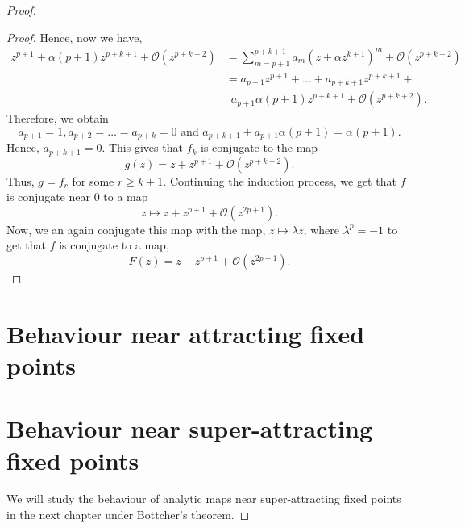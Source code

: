 \begin{proof}
\begin{proof}
	Hence, now we have,
	\begin{align*}
		z^{p+1}+\alpha(p+1)z^{p+k+1}+\mathcal{O}(z^{p+k+2})&=\sum_{m=p+1}^{p+k+1} a_m(z+\alpha z^{k+1})^m+\mathcal{O}(z^{p+k+2})\\
														   &=a_{p+1}z^{p+1}+\ldots +a_{p+k+1}z^{p+k+1}+\\&\,\,\,a_{p+1}\alpha(p+1)z^{p+k+1}+\mathcal{O}(z^{p+k+2})
	.\end{align*}
	Therefore, we obtain \[
		a_{p+1}=1,a_{p+2}=\ldots =a_{p+k}=0\text{ and }a_{p+k+1}+a_{p+1}\alpha(p+1)=\alpha(p+1)
	.\] 
	Hence, \( a_{p+k+1}=0 \). This gives that \( f_k \) is conjugate to the map \[
		g(z)=z+z^{p+1}+\mathcal{O}(z^{p+k+2})
	.\] 
	Thus, \( g=f_r \) for some \( r\ge k+1 \). Continuing the induction process, we get that \( f \)
	is conjugate near \( 0 \) to a map \[
		z\mapsto z+z^{p+1}+\mathcal{O}(z^{2p+1})
	.\] 
	Now, we an again conjugate this map with the map, \( z\mapsto \lambda z \), where \( \lambda^p=-1 \) to get that \( f \) is conjugate to a map, \[
		F(z)=z-z^{p+1}+\mathcal{O}(z^{2p+1})
	.\] 
\end{proof}

\section{Behaviour near attracting fixed points}

\section{Behaviour near super-attracting fixed points}
We will study the behaviour of analytic maps near super-attracting fixed
points in the next chapter under Bottcher's theorem.

\end{proof}
